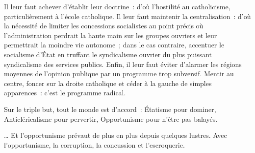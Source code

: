 \documentclass[french,twoside]{book} %
\newcommand{\astermono}{\medskip\centerline{\color{rubric}\large\selectfont{\syms ✻}}\medskip\par}%
\begin{document}
\astermono

\noindent Il leur faut achever d’établir leur doctrine : d’où l’hostilité au catholicisme, particulièrement à l’école catholique. Il leur faut maintenir la centralisation : d’où la nécessité de limiter les concessions socialistes au point précis où l’administration perdrait la haute main sur les groupes ouvriers et leur permettrait la moindre vie autonome ; dans le cas contraire, accentuer le socialisme d’État en truffant le syndicalisme ouvrier du plus puissant syndicalisme des services publics. Enfin, il leur faut éviter d’alarmer les régions moyennes de l’opinion publique par un programme trop subversif. Mentir au centre, foncer sur la droite catholique et céder à la gauche de simples apparences : c’est le programme radical.\par
Sur le triple but, tout le monde est d’accord : Étatisme pour dominer, Anticléricalisme pour pervertir, Opportunisme pour n’être pas balayés.\par
… Et l’opportunisme prévaut de plus en plus depuis quelques lustres. Avec l’opportunisme, la corruption, la concussion et l’escroquerie.\par

\astermono
\end{document}
